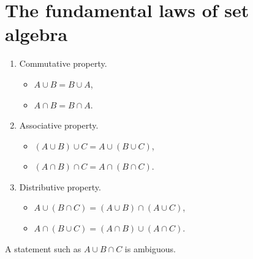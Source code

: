 \documentclass[lecture]{csm}
\def\it{\item}
\def\bit{\begin{itemize}}
\def\eit{\end{itemize}}
\def\ben{\begin{enumerate}}
\def\een{\end{enumerate}}
\begin{document}
%
\clearpage

\section{The fundamental laws of set algebra}
\begin{definition}
\ben
\it Commutative property.
\bit 
\it $A\cup B = B\cup A$,
\it $A\cap B = B\cap A$.
\eit
\it Associative property.
\bit 
\it $(A\cup B)\cup C = A\cup (B\cup C)$,
\it $(A\cap B)\cap C = A\cap (B\cap C)$.
\eit
\it Distributive property.
\bit 
\it $A\cup (B\cap C) = (A\cup B)\cap(A\cup C)$,
\it $A\cap (B\cup C) = (A\cap B)\cup(A\cap C)$.
\eit
\een
\end{definition}

\begin{remark}
A statement such as $A\cup B\cap C$ is ambiguous. 
\end{remark}
\end{document}
